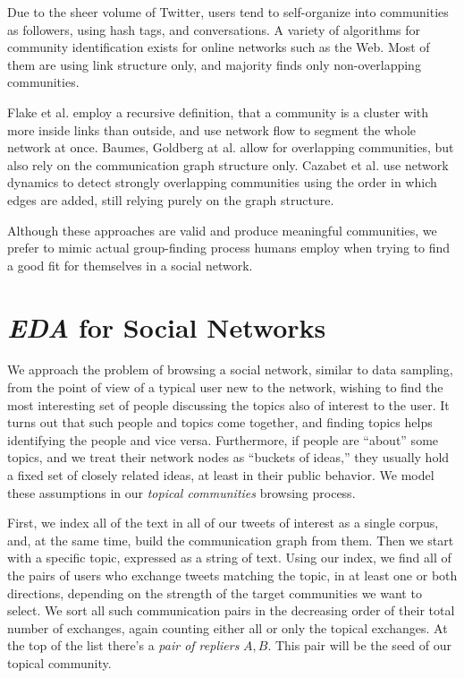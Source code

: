 \documentclass[10pt,oneside]{memoir}
\begin{document}
Due to the sheer volume of Twitter, users tend to self-organize into communities as followers, using hash tags, and conversations.  A variety of algorithms for community identification exists for online networks such as the Web.  Most of them are using link structure only, and majority finds only non-overlapping communities.


Flake et al. \cite{Flake:2002:Communities} employ a recursive definition, that a community is a cluster with more inside links than outside, and use network flow to segment the whole network at once.  Baumes, Goldberg at al. \cite{Baumes:2010:Overlapping, Goldberg:2010:OverlappingClusters} allow for overlapping communities, but also rely on the communication graph structure only.  Cazabet et al. \cite{Cazabet:2010:Communities} use network dynamics to detect strongly overlapping communities using the order in which edges are added, still relying purely on the graph structure.


Although these approaches are valid and produce meaningful communities, we prefer to mimic actual group-finding process humans employ when trying to find a good fit for themselves in a social network.


\pagebreak \section{{\itshape EDA} for Social Networks}
\label{eda_forsocialnetworks}

We approach the problem of browsing a social network, similar to data sampling, from the point of view of a typical user new to the network, wishing to find the most interesting set of people discussing the topics also of interest to the user.  It turns out that such people and topics come together, and finding topics helps identifying the people and vice versa.  Furthermore, if people are ``about'' some topics, and we treat their network nodes as ``buckets of ideas,'' they usually hold a fixed set of closely related ideas, at least in their public behavior.  We model these assumptions in our {\itshape topical communities} browsing process.


First, we index all of the text in all of our tweets of interest as a single corpus, and, at the same time, build the communication graph from them.   Then we start with a specific topic, expressed as a string of text.  Using our index, we find all of the pairs of users who exchange tweets matching the topic, in at least one or both directions, depending on the strength of the target communities we want to select.  We sort all such communication pairs in the decreasing order of their total number of exchanges, again counting either all or only the topical exchanges.  At the top of the list there's a {\itshape pair of repliers} ${A,B}$.  This pair will be the seed of our topical community.  
\end{document}
